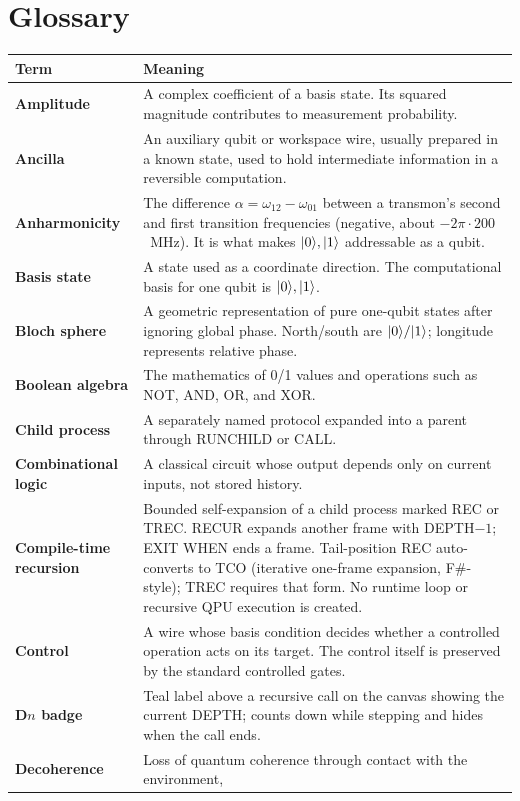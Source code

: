 \section{Glossary}

\begin{longtable}{>{\bfseries}p{}p{}}
\toprule
Term & Meaning\\
\midrule
\endhead
Amplitude & A complex coefficient of a basis state. Its squared magnitude
contributes to measurement probability.\\
Ancilla & An auxiliary qubit or workspace wire, usually prepared in a known
state, used to hold intermediate information in a reversible computation.\\
Anharmonicity & The difference $\alpha=\omega_{12}-\omega_{01}$ between a
transmon's second and first transition frequencies (negative, about
$-2\pi\cdot200$~MHz). It is what makes $\lvert 0\rangle,\lvert 1\rangle$ addressable as a qubit.\\
Basis state & A state used as a coordinate direction. The computational basis
for one qubit is $\lvert 0\rangle,\lvert 1\rangle$.\\
Bloch sphere & A geometric representation of pure one-qubit states after
ignoring global phase. North/south are $\lvert 0\rangle/\lvert 1\rangle$; longitude represents
relative phase.\\
Boolean algebra & The mathematics of 0/1 values and operations such as NOT,
AND, OR, and XOR.\\
Child process & A separately named protocol expanded into a parent through
RUNCHILD or CALL.\\
Combinational logic & A classical circuit whose output depends only on current
inputs, not stored history.\\
Compile-time recursion & Bounded self-expansion of a child process marked REC
or TREC. RECUR expands another frame with DEPTH$-1$; EXIT WHEN ends a frame.
Tail-position REC auto-converts to TCO (iterative one-frame expansion, F\#-style);
TREC requires that form. No runtime loop or recursive QPU execution is created.\\
Control & A wire whose basis condition decides whether a controlled operation
acts on its target. The control itself is preserved by the standard controlled
gates.\\
D$n$ badge & Teal label above a recursive call on the canvas showing the
current DEPTH; counts down while stepping and hides when the call ends.\\
Decoherence & Loss of quantum coherence through contact with the environment,

\end{longtable}
